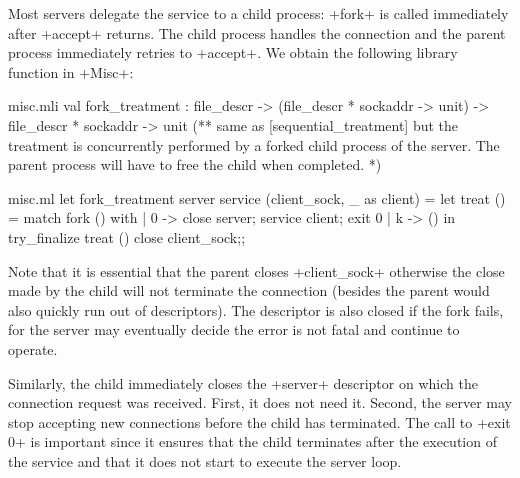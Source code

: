 Most servers delegate the service to a child process: \ml+fork+ is called
immediately after \ml+accept+ returns. The child process handles the
connection and the parent process immediately retries to \ml+accept+. We
obtain the following library function in \ml+Misc+:
%
\begin{codefile}{misc.mli}
val fork_treatment :
 file_descr -> (file_descr * sockaddr -> unit) ->
 file_descr * sockaddr -> unit
(** same as [sequential_treatment] but the treatment is concurrently
 performed by a forked child process of the server. The parent process
 will have to free the child when completed. *)
\end{codefile}
%
\begin{listingcodefile}{misc.ml}
let fork_treatment server service (client_sock, _ as client) =
  let treat () = match fork () with
    | 0 -> close server; service client; exit 0
    | k -> ()
  in
  try_finalize treat () close client_sock;;
\end{listingcodefile}
% 
Note that it is essential that the parent closes \ml+client_sock+
otherwise the close made by the child will not terminate the
connection (besides the parent would also quickly run out of
descriptors). The descriptor is also closed if the fork fails, for the
server may eventually decide the error is not fatal and continue to
operate.

Similarly, the child immediately closes the \ml+server+ descriptor on
which the connection request was received. First, it does not need
it. Second, the server may stop accepting new connections before
the child has terminated. The call to \ml+exit 0+ is important since
it ensures that the child terminates after the execution of the
service and that it does not start to execute the server loop.

